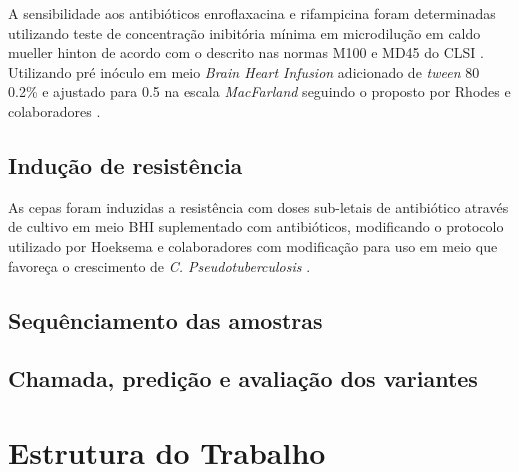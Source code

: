 A sensibilidade aos antibióticos enroflaxacina e rifampicina foram determinadas utilizando teste de concentração inibitória mínima em microdilução em 
caldo mueller hinton de acordo com o descrito nas
normas M100 e MD45 do CLSI \cite{clsi2020, clsi2015}. Utilizando pré inóculo em meio \textit{Brain Heart Infusion} adicionado de \textit{tween} 80 0.2\%
e ajustado para 0.5 na escala \textit{MacFarland} seguindo o proposto por Rhodes e colaboradores \cite{rhodes2015}.


\subsection{Indução de resistência}

As cepas foram induzidas a resistência com doses sub-letais de antibiótico através de cultivo em meio BHI suplementado com antibióticos,
modificando o protocolo utilizado por Hoeksema e colaboradores com modificação para uso em meio que favoreça o crescimento de \textit{C. Pseudotuberculosis}
\cite{hoeksema2019}.


\subsection{Sequênciamento das amostras}


\subsection{Chamada, predição e avaliação dos variantes}

\section{Estrutura do Trabalho}



